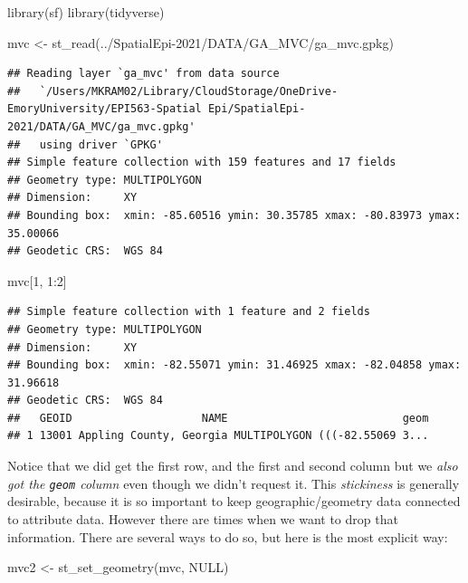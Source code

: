 \documentclass[
]{book}
\newenvironment{Shaded}{\begin{snugshade}}{\end{snugshade}}
\newcommand{\ConstantTok}[1]{\textcolor[rgb]{0.00,0.00,0.00}{#1}}
\newcommand{\DecValTok}[1]{\textcolor[rgb]{0.00,0.00,0.81}{#1}}
\newcommand{\FunctionTok}[1]{\textcolor[rgb]{0.00,0.00,0.00}{#1}}
\newcommand{\NormalTok}[1]{#1}
\newcommand{\OtherTok}[1]{\textcolor[rgb]{0.56,0.35,0.01}{#1}}
\newcommand{\SpecialCharTok}[1]{\textcolor[rgb]{0.00,0.00,0.00}{#1}}
\newcommand{\StringTok}[1]{\textcolor[rgb]{0.31,0.60,0.02}{#1}}
\begin{document}
\begin{Shaded}
\begin{Highlighting}[]
\FunctionTok{library}\NormalTok{(sf)}
\FunctionTok{library}\NormalTok{(tidyverse)}

\NormalTok{mvc }\OtherTok{\textless{}{-}} \FunctionTok{st\_read}\NormalTok{(}\StringTok{\textquotesingle{}../SpatialEpi{-}2021/DATA/GA\_MVC/ga\_mvc.gpkg\textquotesingle{}}\NormalTok{)}
\end{Highlighting}
\end{Shaded}

\begin{verbatim}
## Reading layer `ga_mvc' from data source 
##   `/Users/MKRAM02/Library/CloudStorage/OneDrive-EmoryUniversity/EPI563-Spatial Epi/SpatialEpi-2021/DATA/GA_MVC/ga_mvc.gpkg' 
##   using driver `GPKG'
## Simple feature collection with 159 features and 17 fields
## Geometry type: MULTIPOLYGON
## Dimension:     XY
## Bounding box:  xmin: -85.60516 ymin: 30.35785 xmax: -80.83973 ymax: 35.00066
## Geodetic CRS:  WGS 84
\end{verbatim}

\begin{Shaded}
\begin{Highlighting}[]
\NormalTok{mvc[}\DecValTok{1}\NormalTok{, }\DecValTok{1}\SpecialCharTok{:}\DecValTok{2}\NormalTok{]}
\end{Highlighting}
\end{Shaded}

\begin{verbatim}
## Simple feature collection with 1 feature and 2 fields
## Geometry type: MULTIPOLYGON
## Dimension:     XY
## Bounding box:  xmin: -82.55071 ymin: 31.46925 xmax: -82.04858 ymax: 31.96618
## Geodetic CRS:  WGS 84
##   GEOID                    NAME                           geom
## 1 13001 Appling County, Georgia MULTIPOLYGON (((-82.55069 3...
\end{verbatim}

Notice that we did get the first row, and the first and second column but we \emph{also got the \texttt{geom} column} even though we didn't request it. This \emph{stickiness} is generally desirable, because it is so important to keep geographic/geometry data connected to attribute data. However there are times when we want to drop that information. There are several ways to do so, but here is the most explicit way:

\begin{Shaded}
\begin{Highlighting}[]
\NormalTok{mvc2 }\OtherTok{\textless{}{-}} \FunctionTok{st\_set\_geometry}\NormalTok{(mvc, }\ConstantTok{NULL}\NormalTok{)}
\end{Highlighting}
\end{Shaded}
\end{document}
